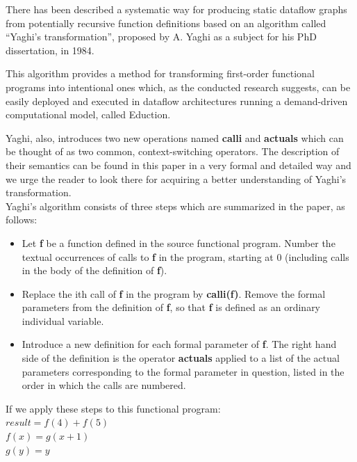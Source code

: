 \documentclass[ack,preface]{dithesis}
\begin{document}
There has been described a systematic way for producing static dataflow graphs from potentially recursive function definitions based on an algorithm called “Yaghi’s transformation”, proposed by A. Yaghi as a subject for his PhD dissertation, in 1984.

This algorithm provides a method for transforming first-order functional programs into intentional ones which, as the conducted research suggests, can be easily deployed and executed in dataflow architectures running a demand-driven computational model, called Eduction.

Yaghi, also, introduces two new operations named \textbf{calli} and \textbf{actuals} which can be  thought of as two common, context-switching operators. 
The description of their semantics can be found in this paper \cite{Rondogiannis:1997} in a very formal and detailed way and we urge the reader to look there for acquiring a better understanding of Yaghi's transformation.\\

Yaghi's algorithm consists of three steps which are summarized in the paper, as follows:

    \begin{itemize}
    \item Let \textbf{f} be a function defined in the source functional program. Number the textual occurrences of calls to \textbf{f} in the program, starting at 0 (including calls in the body of the definition of \textbf{f}).
   
   \item Replace the ith call of \textbf{f} in the program by \textbf{calli(f)}. Remove the formal parameters from the definition of \textbf{f}, so that \textbf{f} is defined as an ordinary individual variable.
   
   \item Introduce a new definition for each formal parameter of \textbf{f}. The right hand side of the definition is the operator \textbf{actuals} applied to a list of the actual parameters corresponding to the formal parameter in question, listed in the order in which the calls are numbered.
    \end{itemize}


\begin{flushleft}
If we apply these steps to this functional program:\\
 \setlength{\parindent}{25ex} $result = f(4) + f(5)$ \\
$f(x) = g(x+1)$ \\ 
$g(y) = y$
\end{flushleft}
\end{document}
